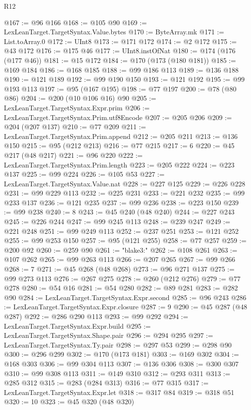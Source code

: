 \begin{lexlean}{R12}
\begin{coremodule}
{{{{{{{{{{{{{{{{{{{{{{{{{{{{{{{{{{{{{{{{{{{{{{{{{{{{{{{{{{{{{{{{{{{{{{{{{{{{{{{{{{{{{{{{{{{{{{{{{{{{{{{{{{@167 := @96 @166
@168 := @105 @90
@169 := LexLeanTarget.TargetSyntax.Value.bytes
@170 := ByteArray.mk
@171 := List.toArray.{0}
@172 := UInt8
@173 := @171 @172
@174 := @2 @172
@175 := @43 @172
@176 := @175 @46
@177 := UInt8.instOfNat
@180 := @174 (@176 (@177 @46))
@181 := @15 @172
@184 := @170 (@173 (@180 @181))
@185 := @169 @184
@186 := @168 @185
@188 := @99 @186 @113
@189 := @136 @188
@190 := @121 @189
@192 := @99 @190 @150
@193 := @121 @192
@195 := @99 @193 @113
@197 := @95 (@167 @195)
@198 := @77 @197
@200 := @78 (@80 @86)
@204 := @200 (@10 @106 @16) @90
@205 := LexLeanTarget.TargetSyntax.Expr.prim
@206 := LexLeanTarget.TargetSyntax.Prim.utf8Encode
@207 := @205 @206
@209 := @204 (@207 @137)
@210 := @77 @209
@211 := LexLeanTarget.TargetSyntax.Prim.append
@212 := @205 @211
@213 := @136 @150
@215 := @95 (@212 @213)
@216 := @77 @215
@217 := 6
@220 := @45 @217 (@48 @217)
@221 := @96 @220
@222 := LexLeanTarget.TargetSyntax.Prim.length
@223 := @205 @222
@224 := @223 @137
@225 := @99 @224
@226 := @105 @53
@227 := LexLeanTarget.TargetSyntax.Value.nat
@228 := @227 @125
@229 := @226 @228
@231 := @99 @229 @113
@232 := @225 @231
@233 := @221 @232
@235 := @99 @233 @137
@236 := @121 @235
@237 := @99 @236
@238 := @223 @150
@239 := @99 @238
@240 := 8
@243 := @45 @240 (@48 @240)
@244 := @227 @243
@245 := @226 @244
@247 := @99 @245 @113
@248 := @239 @247
@249 := @221 @248
@251 := @99 @249 @113
@252 := @237 @251
@253 := @121 @252
@255 := @99 @253 @150
@257 := @95 (@121 @255)
@258 := @77 @257
@259 := @200 @92
@260 := @259 @90
@261 := "blake3:"
@262 := @108 @261
@263 := @107 @262
@265 := @99 @263 @113
@266 := @207 @265
@267 := @99 @266
@268 := 7
@271 := @45 @268 (@48 @268)
@273 := @96 @271 @137
@275 := @99 @273 @113
@276 := @267 @275
@278 := @260 (@212 @276)
@279 := @77 @278
@280 := @54 @16
@281 := @54 @280
@282 := @89 @281
@283 := @282 @90
@284 := LexLeanTarget.TargetSyntax.Expr.second
@285 := @96 @243
@286 := LexLeanTarget.TargetSyntax.Expr.closure
@287 := 9
@290 := @45 @287 (@48 @287)
@292 := @286 @290 @113
@293 := @99 @292
@294 := LexLeanTarget.TargetSyntax.Expr.build
@295 := LexLeanTarget.TargetSyntax.Shape.pair
@296 := @294 @295
@297 := LexLeanTarget.TargetSyntax.Ty.pair
@298 := @297 @53
@299 := @298 @90
@300 := @296 @299
@302 := @170 (@173 @181)
@303 := @169 @302
@304 := @168 @303
@306 := @99 @304 @113
@307 := @136 @306
@308 := @300 @307
@310 := @99 @308 @113
@311 := @149 @310
@312 := @293 @311
@313 := @285 @312
@315 := @283 (@284 @313)
@316 := @77 @315
@317 := LexLeanTarget.TargetSyntax.Expr.let
@318 := @317 @84
@319 := @318 @51
@320 := 10
@323 := @45 @320 (@48 @320)
}}}}}}}}}}}}}}}}}}}}}}}}}}}}}}}}}}}}}}}}}}}}}}}}}}}}}}}}}}}}}}}}}}}}}}}}}}}}}}}}}}}}}}}}}}}}}}}}}}}}}}}}}}
\end{coremodule}
\end{lexlean}
